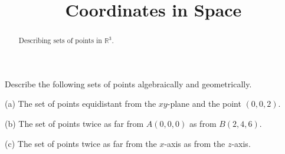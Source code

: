 \documentclass{ximera}
\title{Coordinates in Space}
\begin{document}
\begin{abstract}
Describing sets of points in $\mathbb{R}^3$.
\end{abstract}
\maketitle


Describe the following sets of points algebraically and geometrically.

(a) The set of points equidistant from the $xy$-plane and the point $(0,0,2)$.

(b) The set of points twice as far from $A(0,0,0)$ as from $B(2,4,6)$.

(c) The set of points twice as far from the $x$-axis as from the $z$-axis.


 
\begin{onlineOnly}
    \begin{center}
\end{center}
\end{onlineOnly}
\end{document}
